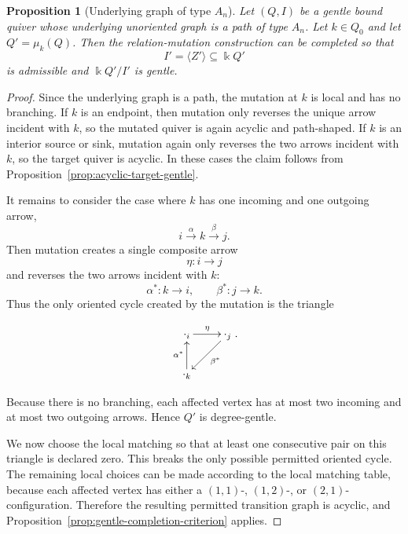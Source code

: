 \documentclass[11pt]{article}
\newcommand{\K}{\Bbbk}
\theoremstyle{plain}
\newtheorem{proposition}[theorem]{Proposition}
\theoremstyle{definition}
\theoremstyle{remark}
\begin{document}
\begin{proposition}[Underlying graph of type \(A_n\)]
\label{prop:An-class-gentle}
Let \((Q,I)\) be a gentle bound quiver whose underlying unoriented graph is a
path of type \(A_n\).  Let \(k\in Q_0\) and let \(Q'=\mu_k(Q)\).  Then the
relation-mutation construction can be completed so that
\[
  I'=\langle Z'\rangle\subseteq \K Q'
\]
is admissible and \(\K Q'/I'\) is gentle.
\end{proposition}

\begin{proof}
Since the underlying graph is a path, the mutation at \(k\) is local and has no
branching.  If \(k\) is an endpoint, then mutation only reverses the unique
arrow incident with \(k\), so the mutated quiver is again acyclic and
path-shaped.  If \(k\) is an interior source or sink, mutation again only
reverses the two arrows incident with \(k\), so the target quiver is acyclic.
In these cases the claim follows from Proposition~\ref{prop:acyclic-target-gentle}.

It remains to consider the case where \(k\) has one incoming and one outgoing
arrow,
\[
  i\xrightarrow{\alpha} k\xrightarrow{\beta} j.
\]
Then mutation creates a single composite arrow
\[
  \eta:i\to j
\]
and reverses the two arrows incident with \(k\):
\[
  \alpha^*:k\to i,
  \qquad
  \beta^*:j\to k.
\]
Thus the only oriented cycle created by the mutation is the triangle


\begin{equation}\label{}
\nonumber   \xymatrix{
\cdot_{i} \ar[r]^{\eta} & \ar[dl]^{\beta^*}\cdot_{j}   \\
\cdot_{k}\ar[u]^{\alpha^*}}.
  \end{equation}


Because there is no branching, each affected vertex has at most two incoming
and at most two outgoing arrows.  Hence \(Q'\) is degree-gentle.

We now choose the local matching so that at least one consecutive pair on this
triangle is declared zero.  This breaks the only possible permitted oriented
cycle.  The remaining local choices can be made according to the local matching
table, because each affected vertex has either a \((1,1)\)-, \((1,2)\)-, or
\((2,1)\)-configuration.  Therefore the resulting permitted transition graph is
acyclic, and Proposition~\ref{prop:gentle-completion-criterion} applies.
\end{proof}
\end{document}
